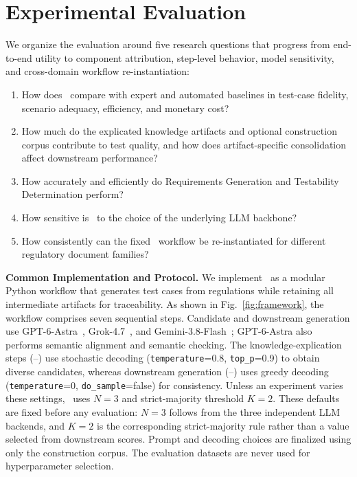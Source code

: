 \section{Experimental Evaluation}
\label{sec:experiment}

We organize the evaluation around five research questions that progress from
end-to-end utility to component attribution, step-level behavior, model
sensitivity, and cross-domain workflow re-instantiation:
\begin{enumerate}[leftmargin=*,align=left, itemsep=0pt, parsep=0pt, nosep]
    \item[\textbf{RQ1:}] How does \ourtool\ compare with expert and automated baselines in test-case fidelity, scenario adequacy, efficiency, and monetary cost?
    \item[\textbf{RQ2:}] How much do the explicated knowledge artifacts and optional construction corpus contribute to test quality, and how does artifact-specific consolidation affect downstream performance?
    \item[\textbf{RQ3:}] How accurately and efficiently do Requirements Generation and Testability Determination perform?
    \item[\textbf{RQ4:}] How sensitive is \ourtool\ to the choice of the underlying LLM backbone?
    \item[\textbf{RQ5:}] How consistently can the fixed \ourtool\ workflow be re-instantiated for different regulatory document families?
\end{enumerate}

\noindent
\textbf{Common Implementation and Protocol.}
We implement \ourtool\ as a modular Python workflow that generates test cases from
regulations while retaining all intermediate artifacts for traceability. As
shown in Fig.~\ref{fig:framework}, the workflow comprises seven sequential
steps. Candidate and downstream generation use
GPT-6-Astra~\cite{gpt}, Grok-4.7~\cite{grok}, and
Gemini-3.8-Flash~\cite{gemini}; GPT-6-Astra also performs semantic alignment
and semantic checking. The knowledge-explication steps
(--) use stochastic decoding
(\texttt{temperature}=0.8, \texttt{top\_p}=0.9) to obtain diverse candidates,
whereas downstream generation (--) uses greedy decoding
(\texttt{temperature}=0, \texttt{do\_sample}=false) for consistency. Unless an
experiment varies these settings, \ourtool\ uses $N=3$ and strict-majority threshold
$K=2$. These defaults are fixed before any evaluation: $N=3$ follows from the
three independent LLM backends, and $K=2$ is the corresponding strict-majority
rule rather than a value selected from downstream scores. Prompt and decoding
choices are finalized using only the construction corpus. The evaluation
datasets are never used for hyperparameter selection.


